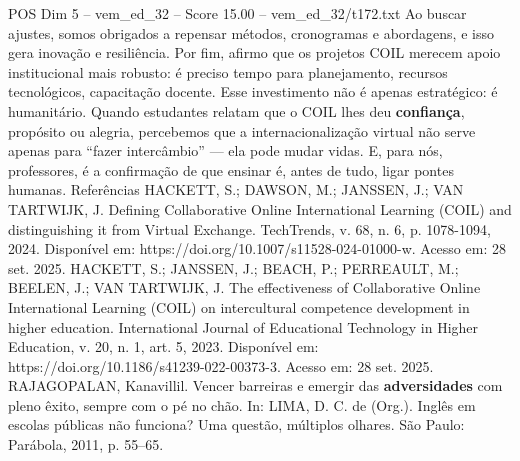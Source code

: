 \begin{textsample}{POS Dim 5 – vem\_ed\_32 – Score 15.00 – vem\_ed\_32/t172.txt}
Ao buscar ajustes, somos obrigados a repensar métodos, cronogramas e abordagens, e isso gera inovação e resiliência.
Por fim, afirmo que os projetos COIL merecem apoio institucional mais robusto: é preciso tempo para planejamento, recursos tecnológicos, capacitação docente.
Esse investimento não é apenas estratégico: é humanitário.
Quando estudantes relatam que o COIL lhes deu \textbf{confiança}, propósito ou alegria, percebemos que a internacionalização virtual não serve apenas para “fazer intercâmbio” — ela pode mudar vidas.
E, para nós, professores, é a confirmação de que ensinar é, antes de tudo, ligar pontes humanas.
Referências HACKETT, S.; DAWSON, M.; JANSSEN, J.; VAN TARTWIJK, J.
Defining Collaborative Online International Learning (COIL) and distinguishing it from Virtual Exchange.
TechTrends, v. 68, n. 6, p. 1078-1094, 2024.
Disponível em: https://doi.org/10.1007/s11528-024-01000-w.
Acesso em: 28 set. 2025.
HACKETT, S.; JANSSEN, J.; BEACH, P.; PERREAULT, M.; BEELEN, J.; VAN TARTWIJK, J.
The effectiveness of Collaborative Online International Learning (COIL) on intercultural competence development in higher education.
International Journal of Educational Technology in Higher Education, v. 20, n. 1, art. 5, 2023.
Disponível em: https://doi.org/10.1186/s41239-022-00373-3.
Acesso em: 28 set. 2025.
RAJAGOPALAN, Kanavillil.
Vencer barreiras e emergir das \textbf{adversidades} com pleno êxito, sempre com o pé no chão.
In: LIMA, D.
C. de (Org.).
Inglês em escolas públicas não funciona?
Uma questão, múltiplos olhares.
São Paulo: Parábola, 2011, p. 55–65.

\end{textsample}
